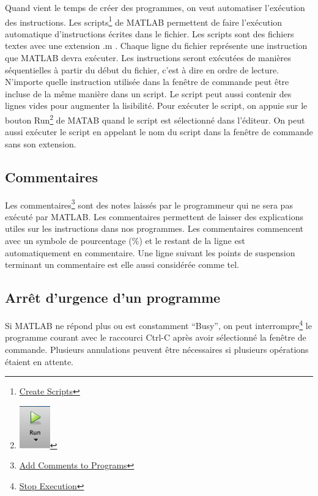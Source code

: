 \documentclass[]{tufte-handout}
\begin{document}
Quand vient le temps de créer des programmes, on veut automatiser
l'exécution des instructions. Les scripts\footnote{\href{https://www.mathworks.com/help/matlab/matlab_prog/create-scripts.html}{Create
  Scripts}} de MATLAB permettent de faire l'exécution automatique
d'instructions écrites dans le fichier. Les scripts sont des fichiers
textes avec une extension .m . Chaque ligne du fichier représente une
instruction que MATLAB devra exécuter. Les instructions seront exécutées
de manières séquentielles à partir du début du fichier, c'est à dire en
ordre de lecture. N'importe quelle instruction utilisée dans la fenêtre
de commande peut être incluse de la même manière dans un script. Le
script peut aussi contenir des lignes vides pour augmenter la
lisibilité. Pour exécuter le script, on appuie sur le bouton
Run\footnote{\includegraphics[width=0.52083in,height=\textheight]{run-button.png}}
de MATAB quand le script est sélectionné dans l'éditeur. On peut aussi
exécuter le script en appelant le nom du script dans la fenêtre de
commande sans son extension.

\hypertarget{commentaires}{%
\subsection{Commentaires}\label{commentaires}}

Les commentaires\footnote{\href{https://www.mathworks.com/help/matlab/matlab_prog/comments.html}{Add
  Comments to Programs}} sont des notes laissés par le programmeur qui
ne sera pas exécuté par MATLAB. Les commentaires permettent de laisser
des explications utiles sur les instructions dans nos programmes. Les
commentaires commencent avec un symbole de pourcentage (\%) et le
restant de la ligne est automatiquement en commentaire. Une ligne
suivant les points de suspension terminant un commentaire est elle aussi
considérée comme tel.

\hypertarget{arruxeat-durgence-dun-programme}{%
\subsection{Arrêt d'urgence d'un
programme}\label{arruxeat-durgence-dun-programme}}

Si MATLAB ne répond plus ou est constamment ``Busy'', on peut
interrompre\footnote{\href{https://www.mathworks.com/help/matlab/matlab_env/stop-execution.html}{Stop
  Execution}} le programme courant avec le raccourci Ctrl-C après avoir
sélectionné la fenêtre de commande. Plusieurs annulations peuvent être
nécessaires si plusieurs opérations étaient en attente.
\end{document}
